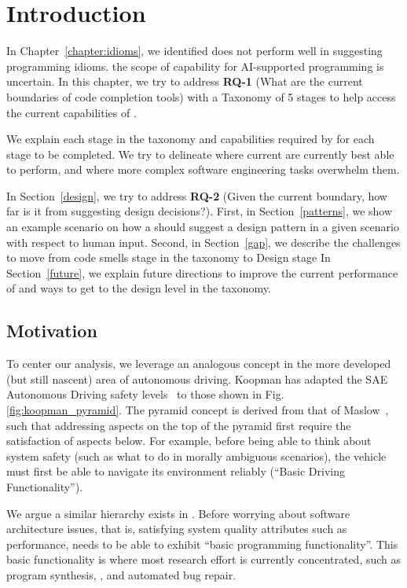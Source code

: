 \label{chapter:framework}

\section{Introduction}
In Chapter~\ref{chapter:idioms}, we identified \cop{} does not perform well in suggesting programming idioms. the scope of capability
for AI-supported programming is uncertain. In this chapter, we try to address \textbf{RQ-1} (What are the current boundaries of code completion tools) with a Taxonomy of 5 stages to help access the current capabilities of \cop{}. 

We explain each stage in the taxonomy and capabilities required by \cct{} for each stage to be completed. We try to delineate where current \cct{} are currently best
able to perform, and where more complex software engineering tasks overwhelm them. 

In Section~\ref{design}, we try to address \textbf{RQ-2} (Given the current boundary, how far is it from suggesting design decisions?). First, in Section~\ref{patterns}, we show an example scenario on how a \cct{} should suggest a design pattern in a given scenario with respect to human input. Second, in Section~\ref{gap}, we describe the challenges to move from code smells stage in the taxonomy to Design stage
In Section~\ref{future}, we explain future directions to improve the current performance of \cop{} and ways to get to the design level in the taxonomy.

\subsection{Motivation}
To center our analysis, we leverage an analogous concept in the more developed (but still nascent) area of autonomous driving. 
Koopman has adapted the SAE Autonomous Driving safety levels~\cite{sae} to those shown in Fig. \ref{fig:koopman_pyramid}. 
The pyramid concept is derived from that of Maslow~\cite{Maslow1943}, such that addressing aspects on the top of the pyramid first require the satisfaction of aspects below. 
For example, before being able to think about system safety (such as what to do in morally ambiguous scenarios), the vehicle must first be able to navigate its environment reliably (``Basic Driving Functionality'').

We argue a similar hierarchy exists in \AISE{}. Before worrying about software architecture issues, that is, satisfying system quality attributes such as performance, \AISE{} needs to be able to exhibit ``basic programming functionality''. This basic functionality is where most research effort is currently concentrated, such as program synthesis, \cct{}, and automated bug repair.

